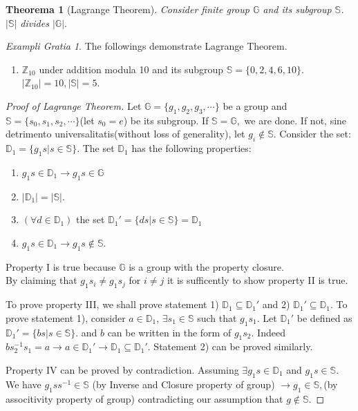 \documentclass[12pt, a4paper]{report}
\newtheorem{theorem}{Theorema}[section]
\theoremstyle{definition}
\theoremstyle{definition}
\theoremstyle{remark}
\newtheorem{example}{Exampli Gratia}[section]
\begin{document}
\begin{theorem}[Lagrange Theorem]
Consider finite group $\mathbb{G}$ and its subgroup $\mathbb{S}$. $|\mathbb{S}|$ divides $|\mathbb{G}|.$	
\end{theorem}
\begin{example}
	The followings demonstrate Lagrange Theorem.
	\begin{enumerate}
		\item $\mathbb{Z}_{10}$ under addition modula 10 and its subgroup $\mathbb{S} = \{0,2,4,6,10\}$. 
		$|\mathbb{Z}_{10}|=10, |\mathbb{S}|=5$.  
	\end{enumerate}
\end{example}
\begin{proof}[Proof of Lagrange Theorem]
	Let $\mathbb{G}=\{g_1, g_2, g_3, \cdots \}$ be a group and $\mathbb{S}= \{s_0, s_1, s_2, \cdots\}$(let $s_0=e$) be its subgroup. 
	If $\mathbb{S}=\mathbb{G},$ we are done. If not, sine detrimento universalitatis(without loss of generality), let  $g_i \notin \mathbb{S}$. 
	Consider the set: $\mathbb{D}_1=\{g_1s|s \in \mathbb{S}\}$. The set $\mathbb{D}_1$ has the following properties:
	\begin{enumerate}
		\item $g_1s \in \mathbb{D}_1 \rightarrow g_1s \in \mathbb{G}$ 
		\item $|\mathbb{D}_1| = |\mathbb{S}|$. 
		\item $(\forall d \in \mathbb{D}_1)$ the set $\mathbb{D}_1'=\{ds|s\in \mathbb{S}\}=\mathbb{D}_1$
		\item $g_1s \in \mathbb{D}_1 \rightarrow g_1s \notin \mathbb{S}.$ 
	\end{enumerate}
	Property I is true because $\mathbb{G}$ is a group with the property closure.\\
	By claiming that $g_1s_i \neq g_1s_j$ for $i \neq j$ it is sufficently to show property II is true.
	
	To prove property III, we shall prove statement 1) $\mathbb{D}_1\subseteq \mathbb{D}_1'$ and 2) $\mathbb{D}_1'\subseteq \mathbb{D}_1$.
	To prove statement 1), consider $a\in \mathbb{D}_1$, $\exists s_1 \in \mathbb{S}$ such that $g_1s_1$. 
	Let $\mathbb{D}_1'$ be defined as $\mathbb{D}_1'=\{bs|s\in \mathbb{S}\}$. 
	and $b$ can be written in the form of $g_1s_2$. 
	Indeed $bs_2^{-1}s_1=a \rightarrow a\in \mathbb{D}_1' \rightarrow \mathbb{D}_1 \subseteq \mathbb{D}_1'.$ Statement 2) can be proved similarly.

	Property IV can be proved by contradiction. Assuming $\exists g_1s \in \mathbb{D}_1$ and $ g_1s \in \mathbb{S}.$ 
	We have $g_1ss^{-1} \in \mathbb{S}$ (by Inverse and Closure property of group) $\rightarrow g_1 \in \mathbb{S},$(by associtivity property of group) contradicting our assumption that $g \notin \mathbb{S}$.


\end{proof}
\end{document}
